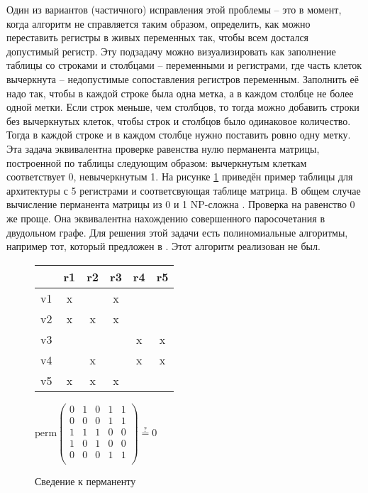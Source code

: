 \documentclass[a4paper,14pt]{extarticle}
\begin{document}
Один из вариантов (частичного) исправления этой проблемы -- это в момент, когда алгоритм не справляется таким образом,
определить, как можно переставить регистры в живых переменных так, чтобы всем достался допустимый регистр.
Эту подзадачу можно визуализировать как заполнение таблицы со строками и столбцами -- переменными и регистрами,
где часть клеток вычеркнута -- недопустимые сопоставления регистров переменным.
Заполнить её надо так, чтобы в каждой строке была одна метка, а в каждом столбце не более одной метки.
Если строк меньше, чем столбцов, то тогда можно добавить строки без вычеркнутых клеток, чтобы строк и столбцов было одинаковое количество.
Тогда в каждой строке и в каждом столбце нужно поставить ровно одну метку.
Эта задача эквивалентна проверке равенства нулю перманента матрицы, построенной по таблицы следующим образом:
вычеркнутым клеткам соответствует 0, невычеркнутым 1.
На рисунке \ref{fig:permanent} приведён пример таблицы для архитектуры с 5 регистрами и соответсвующая таблице матрица.
В общем случае вычисление перманента матрицы из 0 и 1 NP-сложна \cite{valiant_complexity_1979}.
Проверка на равенство 0 же проще.
Она эквивалентна нахождению совершенного паросочетания в двудольном графе.
Для решения этой задачи есть полиномиальные алгоритмы, например тот, который предложен в \cite{chandran_practical_2011}.
Этот алгоритм реализован не был.
    \begin{figure}[h]
        \begin{minipage}[h]{0.47\linewidth}
            \begin{tabular}{*{6}{|c}|}
                \hline
                & r1 & r2 & r3 & r4 & r5\\
                \hline
                v1 & x& & x& & \\
                \hline
                v2 & x& x& x& & \\
                \hline
                v3 & & & & x&x \\
                \hline
                v4 & &x & & x&x \\
                \hline
                v5 & x& x&x & & \\
                \hline
            \end{tabular}
        \end{minipage}
        \begin{minipage}[h]{0.47\linewidth}
            $\text{perm}\left(
            \begin{array}{*{5}{c}}
                0&1&0&1&1\\
                0&0&0&1&1\\
                1&1&1&0&0\\
                1&0&1&0&0\\
                0&0&0&1&1\\
            \end{array}\right) \overset{?}{=} 0$
        \end{minipage}
        \caption{Сведение к перманенту}
        \label{fig:permanent}

    \end{figure}
\end{document}
